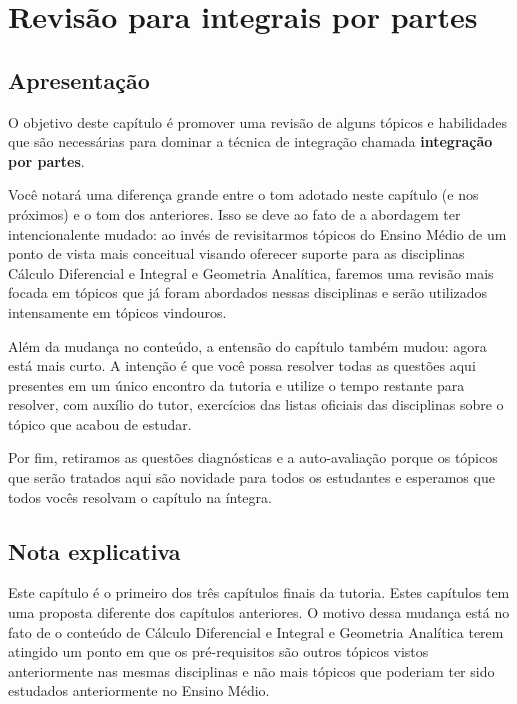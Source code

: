 \documentclass[main_estudante.tex]{subfiles}
\begin{document}
\paraAmbos

\chapter{Revisão para integrais por partes}

\paraAlunos

\section{Apresentação}

O objetivo deste capítulo é promover uma revisão de alguns tópicos e habilidades que são necessárias para dominar a técnica de integração chamada \textbf{integração por partes}.

Você notará uma diferença grande entre o tom adotado neste capítulo (e nos próximos) e o tom dos anteriores. Isso se deve ao fato de a abordagem ter intencionalente mudado: ao invés de revisitarmos tópicos do Ensino Médio de um ponto de vista mais conceitual visando oferecer suporte para as disciplinas Cálculo Diferencial e Integral e Geometria Analítica, faremos uma revisão mais focada em tópicos que já foram abordados nessas disciplinas e serão utilizados intensamente em tópicos vindouros.

Além da mudança no conteúdo, a entensão do capítulo também mudou: agora está mais curto. A intenção é que você possa resolver todas as questões aqui presentes em um único encontro da tutoria e utilize o tempo restante para resolver, com auxílio do tutor, exercícios das listas oficiais das disciplinas sobre o tópico que acabou de estudar.

Por fim, retiramos as questões diagnósticas e a auto-avaliação porque os tópicos que serão tratados aqui são novidade para todos os estudantes e esperamos que todos vocês resolvam o capítulo na íntegra.

\paraTutores

\section{Nota explicativa}

Este capítulo é o primeiro dos três capítulos finais da tutoria. Estes capítulos tem uma proposta diferente dos capítulos anteriores. O motivo dessa mudança está no fato de o conteúdo de Cálculo Diferencial e Integral e Geometria Analítica terem atingido um ponto em que os pré-requisitos são outros tópicos vistos anteriormente nas mesmas disciplinas e não mais tópicos que poderiam ter sido estudados anteriormente no Ensino Médio.
\end{document}
